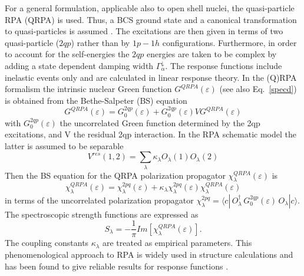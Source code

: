\documentclass[twocolumn,amsmath,amssymb,10pt,groupedaddress,letter]{revtex4}
\begin{document}
For a general formulation, applicable also to open shell nuclei, the
quasi-particle RPA (QRPA) is used. Thus, a BCS ground
state and a canonical transformation to quasi-particles is assumed
\cite{RS}. The excitations are then given in terms of two quasi-particle
($2qp$) rather than by $1p-1h$ configurations. Furthermore, in order
to account for the self-energies the $2qp$ energies are taken to
be complex by adding a state dependent damping width $\Gamma_{\alpha}^{\downarrow}$.
The response functions include inelastic events only and are calculated
in linear response theory.
In the (Q)RPA formalism the intrinsic nuclear Green function $G^{QRPA}(\varepsilon)$ (see also Eq.~\ref{specd}) is obtained from the Bethe-Salpeter (BS) equation \cite{Wal}
\begin{equation}
G^{QRPA}(\varepsilon) = G_{0}^{2qp}(\varepsilon)+ G_{0}^{2qp}(\varepsilon)VG^{QRPA}(\varepsilon)\label{bs1}\end{equation}
with  $G_{0}^{2qp}(\varepsilon)$ the uncorrelated Green function determined by the 2qp excitations, and V the residual 2qp interaction. In the RPA schematic model the latter is assumed to be
separable \begin{equation}
V^{res}(1,2)=\sum_{\lambda}\kappa _{\lambda}O_{\lambda}(1)O_{\lambda}(2)
\end{equation}
Then the BS equation for the QRPA polarization propagator $\chi_{\lambda}^{QRPA}(\varepsilon)$
is \cite{Lenske:01}
\begin{equation}
\chi_{\lambda}^{QRPA}(\varepsilon)=  \chi_{\lambda}^{2pq}(\varepsilon) + \kappa_{\lambda}\chi_{\lambda}^{2pq}(\varepsilon)\chi_{\lambda}^{QRPA}(\varepsilon)\label{bs2}
\end{equation}
in terms of the uncorrelated polarization propagator
$\chi_{\lambda}^{2pq} = \langle c|\,O_{\lambda}^{\dagger
}\,G_{0}^{2qp}(\varepsilon )\,O_{\lambda}|c\rangle$.
The spectroscopic strength functions are expressed as
\begin{equation}
S_{\lambda} =-\frac{1}{\pi}Im[\chi_{\lambda}^{QRPA}(\varepsilon)].
\label{sprpa}
\end{equation}
The coupling constants $\kappa_{\lambda}$
are treated as empirical parameters. This phenomenological approach
to RPA is widely used in structure calculations and has
been found to give reliable results for response functions \cite{BM,Solv}.
\end{document}
